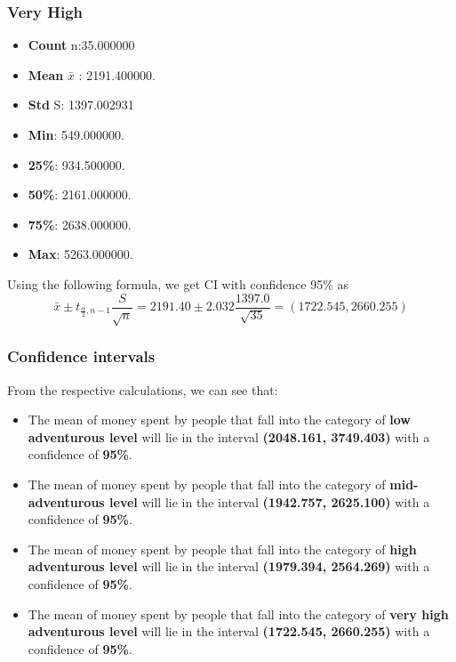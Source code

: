 \documentclass{beamer}
\begin{document}
\begin{frame}
\frametitle{Very High}
       \begin{block}{}
        \begin{itemize}
            \item \textbf{Count} n:35.000000
            \item \textbf{Mean} $\bar{x}$ : 2191.400000.
            \item \textbf{Std} S: 1397.002931
            \item \textbf{Min}: 549.000000.
            \item \textbf{25\%}: 934.500000.
            \item \textbf{50\%}: 2161.000000.
            \item \textbf{75\%}: 2638.000000.
            \item \textbf{Max}: 5263.000000.
        \end{itemize}
    \end{block}
    Using the following formula, we get CI with confidence 95\% as
        \begin{equation}
        \bar{x} \pm t_{\frac{\alpha}{2}, n-1} \frac{S}{\sqrt{n}} =
        2191.40 \pm 2.032 \frac{1397.0}{\sqrt{35}} = (1722.545,2660.255)
        \end{equation}
\end{frame}
\begin{frame}
    \frametitle{Confidence intervals}
    From the respective calculations, we can see that:
    \begin{itemize}
        \item The mean of money spent by people that fall into the category of \textbf{low adventurous level} will lie in the interval \textbf{(2048.161, 3749.403)} with a confidence of \textbf{95\%}.
        
        \item The mean of money spent by people that fall into the category of \textbf{mid-adventurous level} will lie in the interval \textbf{(1942.757, 2625.100)} with a confidence of \textbf{95\%}.
        
        \item The mean of money spent by people that fall into the category of \textbf{high adventurous level} will lie in the interval \textbf{(1979.394, 2564.269)} with a confidence of \textbf{95\%}.
        
        \item The mean of money spent by people that fall into the category of \textbf{very high adventurous level} will lie in the interval \textbf{(1722.545, 2660.255)} with a confidence of \textbf{95\%}.
    \end{itemize}
\end{frame}
\end{document}

